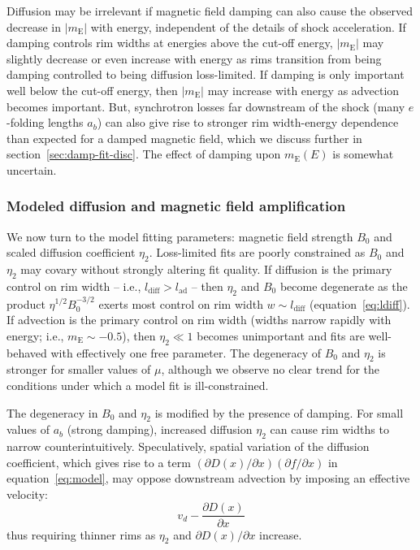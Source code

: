 \documentclass[iop, apj, numberedappendix]{emulateapj}
\newcommand*{\mt}{\mathrm}
\newcommand*{\ptl}{\partial}
\newcommand*{\mE}{m_\mt{E}}
\begin{document}
Diffusion may be irrelevant if magnetic field damping can also cause the
observed decrease in $|\mE|$ with energy, independent of the details of shock
acceleration.  If damping controls rim widths at energies above the cut-off
energy, $|\mE|$ may slightly decrease or even increase with energy as rims
transition from being damping controlled to being diffusion loss-limited.  If
damping is only important well below the cut-off energy, then $|\mE|$ may
increase with energy as advection becomes important.  But, synchrotron
losses far downstream of the shock (many $e$-folding lengths $a_b$) can also
give rise to stronger rim width-energy dependence than expected for a damped
magnetic field, which we discuss further in section~\ref{sec:damp-fit-disc}.
The effect of damping upon $\mE(E)$ is somewhat uncertain.

\subsubsection{Modeled diffusion and magnetic field amplification}

We now turn to the model fitting parameters: magnetic field strength $B_0$ and
scaled diffusion coefficient $\eta_2$.  Loss-limited fits are poorly
constrained as $B_0$ and $\eta_2$ may covary without strongly altering fit
quality.  If diffusion is the primary control on rim width -- i.e.,
$l_{\mt{diff}} > l_{\mt{ad}}$ -- then $\eta_2$ and $B_0$ become degenerate as
the product $\eta^{1/2} B_0^{-3/2}$ exerts most control on rim width $w \sim
l_{\mt{diff}}$ (equation~\eqref{eq:ldiff}).  If advection is the primary
control on rim width (widths narrow rapidly with energy; i.e., $\mE \sim
-0.5$), then $\eta_2 \ll 1$ becomes unimportant and fits are well-behaved with
effectively one free parameter.  The degeneracy of $B_0$ and $\eta_2$ is
stronger for smaller values of $\mu$, although we observe no clear trend for
the conditions under which a model fit is ill-constrained.

The degeneracy in $B_0$ and $\eta_2$ is modified by the presence of damping.
For small values of $a_b$ (strong damping), increased diffusion $\eta_2$ can
cause rim widths to narrow counterintuitively.  Speculatively, spatial
variation of the diffusion coefficient, which gives rise to a term $(\ptl D(x)
/ \ptl x) (\ptl f/\ptl x)$ in equation~\eqref{eq:model}, may oppose downstream
advection by imposing an effective velocity:
\begin{equation}
    v_d - \frac{\ptl D(x)}{\ptl x}
\end{equation}
thus requiring thinner rims as $\eta_2$ and $\ptl D(x) / \ptl x$ increase.
\end{document}
